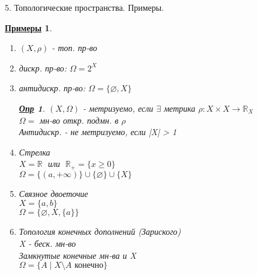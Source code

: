\documentclass[12pt, fleqn]{article}
\newenvironment{question}[1]{\hspace*{-4em} #1}{\newpage}
\newcommand{\R}{\mathbb{R}}
\theoremstyle{nonumbermarginbreak}
\newtheorem{definition}{\hspace*{-2em}\underline{\bfseries Опр}}[section]
\newtheorem{examples}{\hspace*{-2em}\underline{\bfseries Примеры}}[section]
\begin{document}
\begin{question}{5. Топологические пространства. Примеры.}
        \begin{examples} 
            \begin{enumerate}
                \item $(X, \rho)$ - топ. пр-во
                \item дискр. пр-во: $\Omega = 2^X$
                \item антидискр. пр-во: $\Omega = \{\varnothing, X\}$
        
            \begin{definition} 
                $(X, \Omega)$ - метризуемо, если $\exists$ метрика $\rho: X \times X \rightarrow \R_X$\\
                $\Omega = $ мн-во откр. подмн. в $\rho$\\
                Антидискр. - не метризуемо, если |X| > 1
            \end{definition}
                \item Стрелка\\
                      $X = \R  \;$ или $\;  \R_+ = \{x \geq 0\}$\\
                      $\Omega = \{(a, +\infty)\} \cup \{\varnothing\} \cup \{X\}$
                \item Связное двоеточие\\
                      $X = \{a, b\}$\\
                      $\Omega = \{\varnothing, X, \{a\}\}$
                \item Топология конечных дополнений (Зариского)\\
                      X - беск. мн-во\\
                      Замкнутые конечные мн-ва и X \\
                      $\Omega = \{A \; | \; X \setminus A \text{ конечно}\}$
            \end{enumerate}
        \end{examples}
    \end{question}
\end{document}
